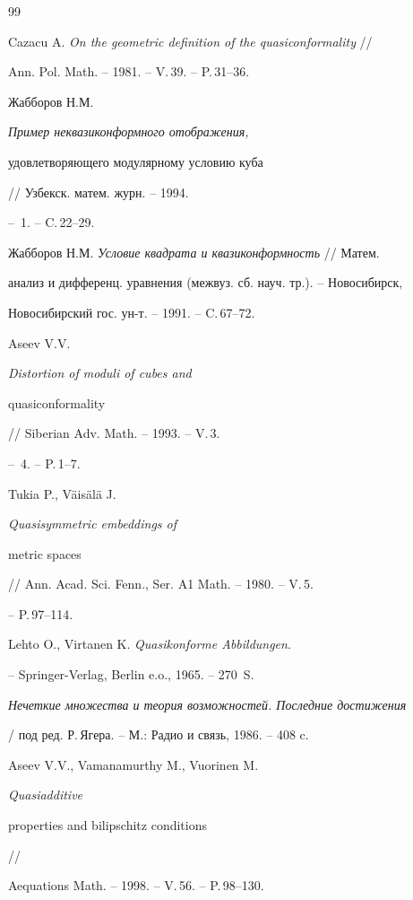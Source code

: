 \begin{thebibliography}{99}


Cazacu A. {\em On the geometric definition of the quasiconformality} //


Ann. Pol. Math. -- 1981. -- V.\,39. -- P.\,31--36.







Жабборов Н.М. {\em Пример неквазиконформного отображения, 


удовлетворяющего модулярному условию куба} // Узбекск. матем. журн. -- 1994.


-- \No\,1. -- C.\,22--29.







Жабборов Н.М. {\em Условие квадрата и квазиконформность} // Матем. 


анализ и дифференц. уравнения (межвуз. сб. науч. тр.). -- Новосибирск, 


Новосибирский гос. ун-т. -- 1991. -- C.\,67--72.







Aseev V.V. {\em Distortion of moduli of cubes and 


quasiconformality} // Siberian Adv. Math. -- 1993. -- V.\,3.


-- \No\,4. -- P.\,1--7.







Tukia P., V\"ais\"al\"a J. {\em Quasisymmetric embeddings of 


metric spaces} // Ann. Acad. Sci. Fenn., Ser. A1 Math. -- 1980. -- V.\,5.


-- P.\,97--114.







Lehto O., Virtanen K. {\em Quasikonforme Abbildungen}. 


-- Springer-Verlag, Berlin e.o., 1965. -- 270~S.







{\em Нечеткие множества и теория возможностей. Последние достижения}


/ под ред. Р.\,Ягера. -- М.: Радио и связь, 1986. -- 408 c.







Aseev V.V., Vamanamurthy M., Vuorinen M. {\em Quasiadditive 


properties and bilipschitz conditions} //


Aequations Math. -- 1998. -- V.\,56. -- P.\,98--130.





\end{thebibliography}





